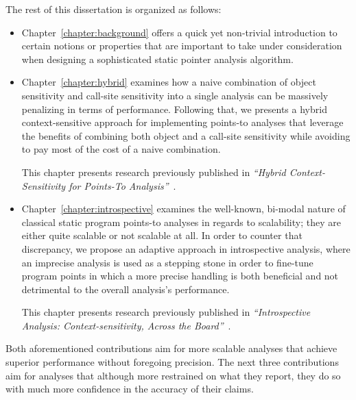 The rest of this dissertation is organized as follows:
\begin{itemize}[$\bullet$]
\item Chapter~\ref{chapter:background} offers a quick yet non-trivial introduction to certain notions or properties that are important to take under consideration when designing a sophisticated static pointer analysis algorithm.

\item Chapter~\ref{chapter:hybrid} examines how a naive combination of object sensitivity and call-site sensitivity into a single analysis can be massively penalizing in terms of performance. Following that, we presents a hybrid context-sensitive approach for implementing points-to analyses that leverage the benefits of combining both object and a call-site sensitivity while avoiding to pay most of the cost of a naive combination.

This chapter presents research previously published in \emph{``Hybrid Context-Sensitivity for Points-To Analysis''}~\cite{pldi:2013:Kastrinis}.

\item Chapter~\ref{chapter:introspective} examines the well-known, bi-modal nature of classical static program points-to analyses in regards to scalability; they are either quite scalable or not scalable at all. In order to counter that discrepancy, we propose an adaptive approach in introspective analysis, where an imprecise analysis is used as a stepping stone in order to fine-tune program points in which a more precise handling is both beneficial and not detrimental to the overall analysis's performance.

This chapter presents research previously published in \emph{``Introspective Analysis: Context-sensitivity, Across the Board''}~\cite{pldi:2014:Smaragdakis}.
\end{itemize}

Both aforementioned contributions aim for more scalable analyses that achieve superior performance without foregoing precision. The next three contributions aim for analyses that although more restrained on what they report, they do so with much more confidence in the accuracy of their claims.

